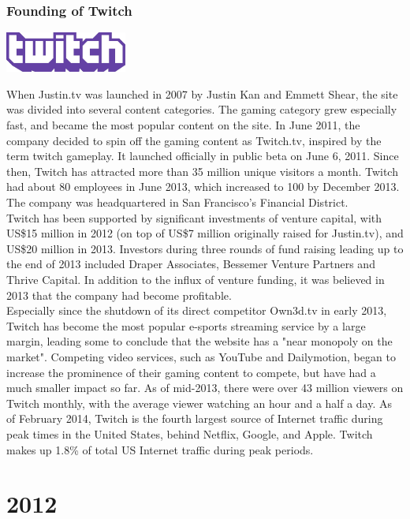 \documentclass[11pt]{report}
\begin{document}
\subsection{Founding of Twitch}
\vspace{2mm}\begin{center}\includegraphics[width=4cm]{./img/twitch.jpg}\end{center}
When Justin.tv was launched in 2007 by Justin Kan and Emmett Shear, the site was divided into several content categories. The gaming category grew especially fast, and became the most popular content on the site. In June 2011, the company decided to spin off the gaming content as Twitch.tv, inspired by the term twitch gameplay. It launched officially in public beta on June 6, 2011. Since then, Twitch has attracted more than 35 million unique visitors a month. Twitch had about 80 employees in June 2013, which increased to 100 by December 2013. The company was headquartered in San Francisco's Financial District.\\
\indent Twitch has been supported by significant investments of venture capital, with US\$15 million in 2012 (on top of US\$7 million originally raised for Justin.tv), and US\$20 million in 2013. Investors during three rounds of fund raising leading up to the end of 2013 included Draper Associates, Bessemer Venture Partners and Thrive Capital. In addition to the influx of venture funding, it was believed in 2013 that the company had become profitable.\\
\indent Especially since the shutdown of its direct competitor Own3d.tv in early 2013, Twitch has become the most popular e-sports streaming service by a large margin, leading some to conclude that the website has a "near monopoly on the market". Competing video services, such as YouTube and Dailymotion, began to increase the prominence of their gaming content to compete, but have had a much smaller impact so far. As of mid-2013, there were over 43 million viewers on Twitch monthly, with the average viewer watching an hour and a half a day. As of February 2014, Twitch is the fourth largest source of Internet traffic during peak times in the United States, behind Netflix, Google, and Apple. Twitch makes up 1.8\% of total US Internet traffic during peak periods.

\chapter{2012}
\end{document}
